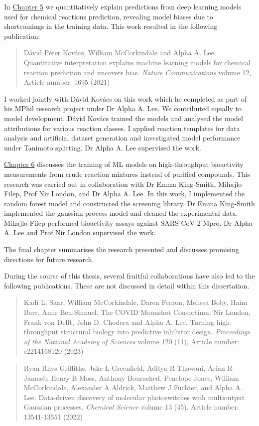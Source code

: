 In \hyperref[ch:transformer]{Chapter 5} we quantitatively explain predictions from deep learning models used for chemical reactions prediction, revealing model biases due to shortcomings in the training data. This work resulted in the following publication:
\begin{quote}
Dávid Péter Kovács, William McCorkindale and Alpha A. Lee. Quantitative interpretation explains machine learning models for chemical reaction prediction and uncovers bias. \textit{Nature Communications} volume 12, Article number: 1695 (2021)
\end{quote}
I worked jointly with Dávid Kovács on this work which he completed as part of his MPhil research project under Dr Alpha A. Lee. We contributed equally to model development. Dávid Kovács trained the models and analysed the model attributions for various reaction classes. I applied reaction templates for data analysis and artificial dataset generation and investigated model performance under Tanimoto splitting. Dr Alpha A. Lee supervised the work.

\hyperref[ch:testing]{Chapter 6} discusses the training of ML models on high-throughput bioactivity measurements from crude reaction mixtures instead of purified compounds. This research was carried out in collaboration with Dr Emma King-Smith, Mihajlo Filep, Prof Nir London, and Dr Alpha A. Lee. In this work, I implemented the random forest model and constructed the screening library. Dr Emma King-Smith implemented the gaussian process model and cleaned the experimental data. Mihajlo Filep performed bioactivity assays against SARS-CoV-2 Mpro. Dr Alpha A. Lee and Prof Nir London supervised the work.

The final chapter summarises the research presented and discusses promising directions for future research.

During the course of this thesis, several fruitful collaborations have also led to the following publications. These are not discussed in detail within this dissertation.

\begin{quote}
 Kadi L. Saar, William McCorkindale, Daren Fearon, Melissa Boby, Haim Barr, Amir Ben-Shmuel, The COVID Moonshot Consortium, Nir London, Frank von Delft, John D. Chodera and Alpha A. Lee. Turning high-throughput structural biology into predictive inhibitor design. \textit{Proceedings of the National Academy of Sciences} volume 120 (11), Article number: e2214168120 (2023)
\end{quote}

\begin{quote}
 Ryan-Rhys Griffiths, Jake L Greenfield, Aditya R Thawani, Arian R Jamasb, Henry B Moss, Anthony Bourached, Penelope Jones, William McCorkindale, Alexander A Aldrick, Matthew J Fuchter, and Alpha A. Lee. Data-driven discovery of molecular photoswitches with multioutput Gaussian processes. \textit{Chemical Science} volume 13 (45), Article number: 13541-13551 (2022)
\end{quote}